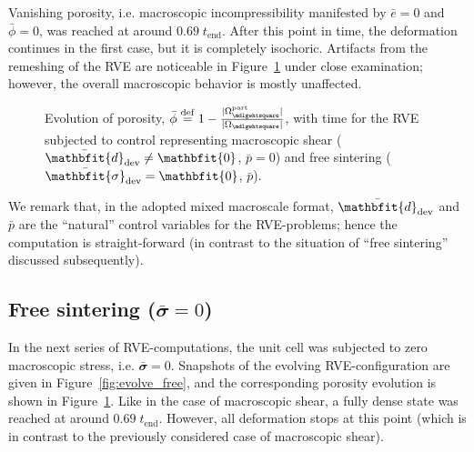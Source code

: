 \documentclass[12pt,review]{elsarticle}
\renewcommand{\ts}[1]{\mathbfit{#1}}
\renewcommand{\Box}{\mdlgwhtsquare}
\newcommand{\figref}[1]{Figure~\ref{#1}}
\newcommand{\particle}{\mathrm{part}}
\begin{document}
Vanishing porosity, i.e. macroscopic incompressibility manifested by $\bar e = 0$ and $\bar{\phi} = 0$, was reached at around $0.69\;t_{\mathrm{end}}$.
After this point in time, the deformation continues in the first case, but it is completely isochoric.
Artifacts from the remeshing of the RVE are noticeable in \figref{fig:evolve_graph} under close examination; however, the overall macroscopic behavior is mostly unaffected.

\begin{figure}[thpb!]
  \centering
  \caption{Evolution of porosity, $\bar{\phi} \defeq 1-\frac{|\Omega_\Box^\particle|}{|\Omega_\Box|}$,  with time for the RVE subjected to control representing macroscopic shear ($\bar{\ts d}_\dev \neq \ts 0$, $\bar{p} = 0$) and free sintering ($\bar{\ts\sigma}_\dev = \ts 0$, $\bar{p}$).}
  \label{fig:evolve_graph}
\end{figure}

We remark that, in the adopted mixed macroscale format, $\bar{\ts d}_\dev$ and $\bar{p}$ are the ``natural'' control variables for the RVE-problems; hence the computation is straight-forward (in contrast to the situation of ``free sintering'' discussed subsequently).

\subsection*{Free sintering ($\bar{\ts\sigma} =\ts 0$)}

In the next series of RVE-computations, the unit cell was subjected to zero macroscopic stress, i.e. $\bar{\ts\sigma} = \ts 0$. Snapshots of the evolving RVE-configuration are given in \figref{fig:evolve_free}, and the corresponding porosity evolution is shown in \figref{fig:evolve_graph}.
Like in the case of macroscopic shear, a fully dense state was reached at around $0.69\;t_{\mathrm{end}}$. However, all deformation stops at this point (which is in contrast to the previously considered case of macroscopic shear).
\end{document}
